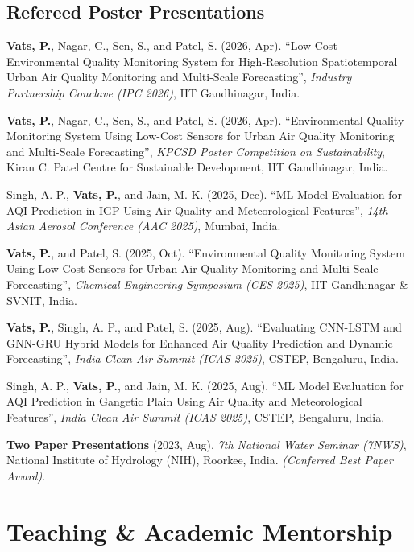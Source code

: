 \documentclass[10pt,a4paper]{article}
\begin{document}
\subsection*{Refereed Poster Presentations}
\begin{enumerate}[leftmargin=18pt, label={[\arabic*]}, resume]
    \item \textbf{Vats, P.}, Nagar, C., Sen, S., and Patel, S. (2026, Apr). ``Low-Cost Environmental Quality Monitoring System for High-Resolution Spatiotemporal Urban Air Quality Monitoring and Multi-Scale Forecasting'', \textit{Industry Partnership Conclave (IPC 2026)}, IIT Gandhinagar, India.
    \item \textbf{Vats, P.}, Nagar, C., Sen, S., and Patel, S. (2026, Apr). ``Environmental Quality Monitoring System Using Low-Cost Sensors for Urban Air Quality Monitoring and Multi-Scale Forecasting'', \textit{KPCSD Poster Competition on Sustainability}, Kiran C. Patel Centre for Sustainable Development, IIT Gandhinagar, India.
    \item Singh, A. P., \textbf{Vats, P.}, and Jain, M. K. (2025, Dec). ``ML Model Evaluation for AQI Prediction in IGP Using Air Quality and Meteorological Features'', \textit{14th Asian Aerosol Conference (AAC 2025)}, Mumbai, India.
    \item \textbf{Vats, P.}, and Patel, S. (2025, Oct). ``Environmental Quality Monitoring System Using Low-Cost Sensors for Urban Air Quality Monitoring and Multi-Scale Forecasting'', \textit{Chemical Engineering Symposium (CES 2025)}, IIT Gandhinagar \& SVNIT, India.
    \item \textbf{Vats, P.}, Singh, A. P., and Patel, S. (2025, Aug). ``Evaluating CNN-LSTM and GNN-GRU Hybrid Models for Enhanced Air Quality Prediction and Dynamic Forecasting'', \textit{India Clean Air Summit (ICAS 2025)}, CSTEP, Bengaluru, India.
    \item Singh, A. P., \textbf{Vats, P.}, and Jain, M. K. (2025, Aug). ``ML Model Evaluation for AQI Prediction in Gangetic Plain Using Air Quality and Meteorological Features'', \textit{India Clean Air Summit (ICAS 2025)}, CSTEP, Bengaluru, India.
    \item \textbf{Two Paper Presentations} (2023, Aug). \textit{7th National Water Seminar (7NWS)}, National Institute of Hydrology (NIH), Roorkee, India. \textit{(Conferred Best Paper Award)}.
\end{enumerate}

\section*{Teaching \& Academic Mentorship}
\end{document}
